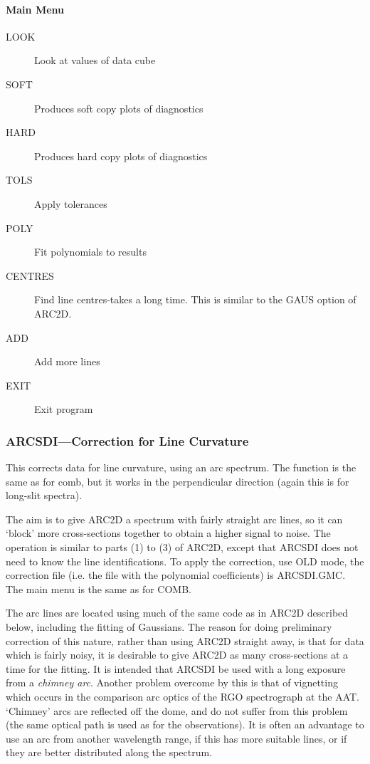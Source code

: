 \paragraph{Main Menu}

\begin{description}
\item[LOOK] Look at values of data cube
\item[SOFT] Produces soft copy plots of diagnostics
\item[HARD] Produces hard copy plots of diagnostics
\item[TOLS] Apply tolerances
\item[POLY] Fit polynomials to results
\item[CENTRES] Find line centres-takes a long time.
This is similar to the GAUS option of ARC2D.
\item[ADD] Add more lines
\item[EXIT] Exit program
\end{description}

\subsubsection{%
ARCSDI---Correction for Line Curvature}

This corrects data for line curvature, using an arc spectrum.
The function is the same as for comb, but it works in the perpendicular
direction (again this is for long-slit spectra).

The aim is to give ARC2D a spectrum with fairly straight arc lines, so
it can `block' more cross-sections together to obtain a higher signal
to noise.
The operation is similar to parts (1) to (3) of ARC2D, except that
ARCSDI does not need to know the line identifications.
To apply the correction, use OLD mode, the correction file (i.e. the
file with the polynomial coefficients) is ARCSDI.GMC.
The main menu is the same as for COMB.

The arc lines are located using much of the same code as in ARC2D
described below, including the fitting of Gaussians. The reason for
doing preliminary correction of this nature, rather than using ARC2D
straight away, is that for data which is fairly noisy, it is desirable
to give ARC2D as many cross-sections at a time for the fitting. It is
intended that ARCSDI be used with a long exposure from a {\em chimney
arc}. Another problem overcome by this is that of vignetting which
occurs in the comparison arc optics of the RGO spectrograph at the
AAT\@. `Chimney' arcs are reflected off the dome, and do not suffer
from this problem (the same optical path is used as for the
observations). It is often an advantage to use an arc from another
wavelength range, if this has more suitable lines, or if they are
better distributed along the spectrum.

